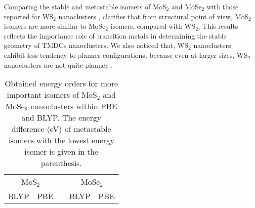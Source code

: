 \documentclass[nofootinbib,10pt,aip,twocolumn,showpacs]{revtex4-1}
\begin{document}
Comparing the stable and metastable isomers of MoS$_2$ and MoSe$_2$
with those reported for WS$_2$ nanoclusters \cite{hafizi2016},
clarifies that from structural point of view,
MoS$_2$ isomers are more similar to MoSe$_2$ isomers, compared with WS$_2$.
This results reflects the importance role of transition metals in determining 
the stable geometry of TMDCs nanoclusters.
We also noticed that, WS$_2$ nanoclusters exhibit less tendency to planner configurations, 
because even at larger sizes, WS$_2$ nanoclusters are not quite planner \cite{hafizi2016}.


\begin{table}
\caption{\label{deltaE}
 Obtained energy orders for more important isomers of MoS$_2$ and MoSe$_2$ 
 nanoclusters within PBE and BLYP.
 The energy difference (eV) of metastable isomers with the lowest energy isomer
 is given in the parenthesis.}
\begin{ruledtabular}
\begin{tabular}{ccccc}
 \multicolumn{2}{c}{MoS$_2$} &&  \multicolumn{2}{c}{MoSe$_2$} \\
\cline{1-2}\cline{4-5}                   
      BLYP    &      PBE     &&      BLYP     &      PBE      \\\hline
                               

\end{tabular}
\end{ruledtabular}
\end{table}
\end{document}
